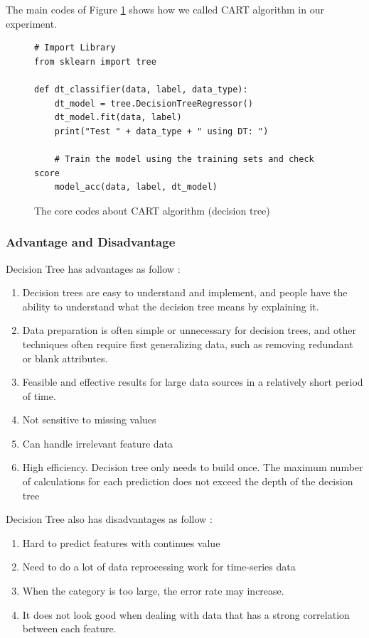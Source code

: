 \documentclass[sigconf]{acmart}
\begin{document}
The main codes of Figure \ref{fig:dt} shows how we called CART algorithm in our experiment.

\begin{figure}[htb]
\centering
\begin{lstlisting}
# Import Library
from sklearn import tree

def dt_classifier(data, label, data_type):
    dt_model = tree.DecisionTreeRegressor()
    dt_model.fit(data, label)
    print("Test " + data_type + " using DT: ")
    
    # Train the model using the training sets and check score
    model_acc(data, label, dt_model)
\end{lstlisting}
\caption{The core codes about CART algorithm (decision tree)}\label{fig:dt}
\end{figure}

\subsubsection{Advantage and Disadvantage}

Decision Tree has advantages as follow \cite{DT}:
\begin{enumerate}
    \item Decision trees are easy to understand and implement, and people have the ability to understand what the decision tree means by explaining it.
    \item Data preparation is often simple or unnecessary for decision trees, and other techniques often require first generalizing data, such as removing redundant or blank attributes.
    \item Feasible and effective results for large data sources in a relatively short period of time.
    \item Not sensitive to missing values
    \item Can handle irrelevant feature data
    \item High efficiency. Decision tree only needs to build once. The maximum number of calculations for each prediction does not exceed the depth of the decision tree
\end{enumerate}

Decision Tree also has disadvantages as follow \cite{DT}:
\begin{enumerate}
    \item Hard to predict features with continues value
    \item Need to do a lot of data reprocessing work for time-series data
    \item When the category is too large, the error rate may increase.
    \item It does not look good when dealing with data that has a strong correlation between each feature.
\end{enumerate}
\end{document}
